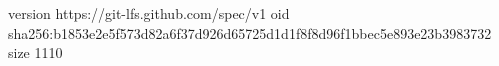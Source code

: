 version https://git-lfs.github.com/spec/v1
oid sha256:b1853e2e5f573d82a6f37d926d65725d1d1f8f8d96f1bbec5e893e23b3983732
size 1110
